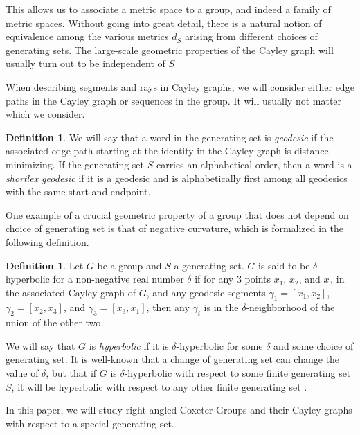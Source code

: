 \documentclass{amsart}
\theoremstyle{definition}
\newtheorem{definition}[theorem]{Definition}
\theoremstyle{remark}
\begin{document}
	This allows us to associate a metric space to a group, and indeed a family of metric spaces. Without going into great detail, there is a natural notion of equivalence among the various metrics $d_S$ arising from different choices of generating sets. The large-scale geometric properties of the Cayley graph will usually turn out to be independent of $S$
    
	When describing segments and rays in Cayley graphs, we will consider either edge paths in the Cayley graph or sequences in the group. It will usually not matter which we consider. 
	
	\begin{definition}
		
		We will say that a word in the generating set is \textit{geodesic} if the associated edge path starting at the identity in the Cayley graph is distance-minimizing. If the generating set $S$ carries an alphabetical order, then a word is a \textit{shortlex geodesic} if it is a geodesic and is alphabetically first among all geodesics with the same start and endpoint.
		
	\end{definition}
	
	One example of a crucial geometric property of a group that does not depend on choice of generating set is that of negative curvature, which is formalized in the following definition.	
	
	\begin{definition}
		
		Let $G$ be a group and $S$ a generating set. $G$ is said to be $\delta$-hyperbolic for a non-negative real number $\delta$ if for any 3 points $x_1$, $x_2$, and $x_3$ in the associated Cayley graph of $G$, and any geodesic segments $\gamma_1=[x_1,x_2]$, $\gamma_2=[x_2, x_3]$, and $\gamma_3=[x_3,x_1]$, then any $\gamma_i$ is in the $\delta$-neighborhood of the union of the other two.
		
	\end{definition}
	
	We will say that $G$ is \textit{hyperbolic} if it is $\delta$-hyperbolic for some $\delta$ and some choice of generating set. It is well-known that a change of generating set can change the value of $\delta$, but that if $G$ is $\delta$-hyperbolic with respect to some finite generating set $S$, it will be hyperbolic with respect to any other finite generating set \cite{BridsonHaefliger}.

	In this paper, we will study right-angled Coxeter Groups and their Cayley graphs with respect to a special generating set. 
	
\end{document}
